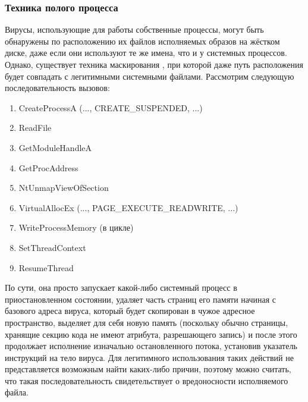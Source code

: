 \subsubsection {Техника полого процесса}
Вирусы, использующие для работы собственные процессы, могут быть обнаружены по расположению их файлов исполняемых образов на жёстком диске, даже если они используют те же имена, что и у системных процессов. Однако, существует техника маскирования \cite{MALWAREBOOK}, при которой даже путь расположения будет совпадать с легитимными системными файлами.
Рассмотрим следующую последовательность вызовов:
\begin {enumerate}
	\item CreateProcessA (..., CREATE\_SUSPENDED, ...)
	\item ReadFile
	\item GetModuleHandleA
	\item GetProcAddress
	\item NtUnmapViewOfSection
	\item VirtualAllocEx (..., PAGE\_EXECUTE\_READWRITE, ...)
	\item WriteProcessMemory (в цикле)
	\item SetThreadContext
	\item ResumeThread
\end{enumerate}
По сути, она просто запускает какой-либо системный процесс в приостановленном состоянии, удаляет часть страниц его памяти начиная с базового адреса вируса, который будет скопирован в чужое адресное пространство, выделяет для себя новую память (поскольку обычно страницы, хранящие секцию кода не имеют атрибута, разрешающего запись) и после этого продолжает исполнение изначально остановленного потока, установив указатель инструкций на тело вируса. Для легитимного использования таких действий не представляется возможным найти каких-либо причин, поэтому можно считать, что такая последовательность свидетельствует о вредоносности исполняемого файла.

